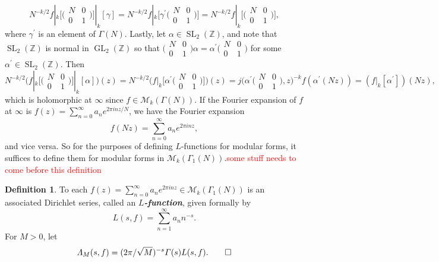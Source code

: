 \documentclass[10pt,leqno,twoside,b5paper]{article}
\theoremstyle{plain}
\theoremstyle{definition}
\newtheorem{definition/}[lem]{Definition}
\newenvironment{definition}
  {\renewcommand{\qedsymbol}{\textdagger}%
   \pushQED{\qed}\begin{definition/}}
  {\popQED\end{definition/}}
\numberwithin{equation}{section}
\numberwithin{lem}{section}
\newcommand{\textib}[1]{\textbf{\textit{#1\index{#1}}}} %
\DeclareMathOperator{\GL}{GL}
\DeclareMathOperator{\SL}{SL}
\newcommand{\slz}{\SL_2(\mathbb{Z})}
\newcommand{\sai}[1]{\textcolor{red}{#1}}
\begin{document}
\[N^{-k/2}f|_k\big[\big(\!\begin{smallmatrix}
    N & 0 \\ 0 & 1
\end{smallmatrix}\!\big)\big]|_k[\gamma] = N^{-k/2}f|_k\big[\gamma^\prime\big(\!\begin{smallmatrix}
    N & 0 \\ 0 & 1
\end{smallmatrix}\!\big)\big] = N^{-k/2}f|_k\big[\big(\!\begin{smallmatrix}
    N & 0 \\ 0 & 1
\end{smallmatrix}\!\big)\big],\] where $\gamma^\prime$ is an element of $\varGamma(N)$. Lastly, let $\alpha\in \slz$, and note that $\slz$ is normal in $\GL_2(\mathbb Z)$ so that $\big(\!\begin{smallmatrix}
    N & 0 \\ 0 & 1
\end{smallmatrix}\!\big)\alpha = \alpha^\prime \big(\!\begin{smallmatrix}
    N & 0 \\ 0 & 1
\end{smallmatrix}\!\big)$ for some $\alpha^\prime\in\slz$. Then 
\[N^{-k/2}\Big(f|_k\big[\big(\!\begin{smallmatrix}
    N & 0 \\ 0 & 1
\end{smallmatrix}\!\big)\big]|_k[\alpha]\Big)(z) = N^{-k/2}\Big(f|_k\big[\alpha^\prime\big(\!\begin{smallmatrix}
    N & 0 \\ 0 & 1
\end{smallmatrix}\!\big)\big]\Big)(z) = j\big(\alpha^\prime\big(\!\begin{smallmatrix}
    N & 0 \\ 0 & 1
\end{smallmatrix}\!\big),z\big)^{-k}f(\alpha^\prime(Nz)) = (f|_k[\alpha^\prime])(Nz),\] which is holomorphic at $\infty$ since $f\in\mathcal M_k(\varGamma(N))$. If the Fourier expansion of $f$ at $\infty$ is $f(z) = \sum_{n =0}^\infty a_ne^{2\pi i n z/N}$, we have the Fourier expansion
\[f(Nz) = \sum_{n =0}^\infty a_ne^{2\pi i n z},\] and vice versa. So for the purposes of defining $L$-functions for modular forms, it suffices to define them for modular forms in $\mathcal M_k(\varGamma_1(N))$.\sai{some stuff needs to come before this definition}
\begin{definition}\label{def: L function}
    To each $f(z) = \sum_{n=0}^\infty a_ne^{2\pi i nz}\in\mathcal M_k(\varGamma_1(N))$ is an associated Dirichlet series, called an \textib{$L$-function}, given formally by
    \[L(s,f) = \sum_{n=1}^\infty a_nn^{-s}.\] For $M>0$, let 
    \[\varLambda_M(s,f) = (2\pi/\sqrt{M})^{-s}\varGamma(s)L(s,f).\qedhere\]
\end{definition}
\end{document}
